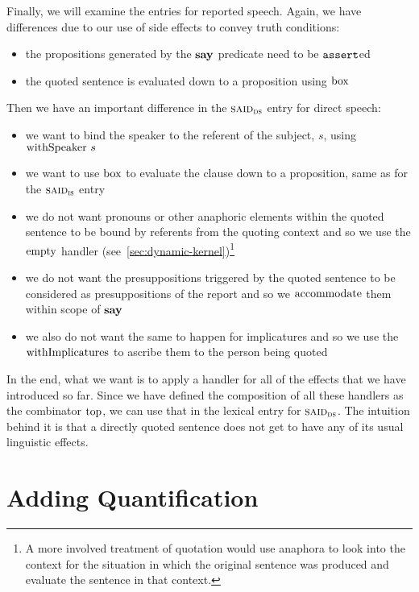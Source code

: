 Finally, we will examine the entries for reported speech. Again, we have
differences due to our use of side effects to convey truth conditions:

\begin{itemize}
\item the propositions generated by the $\textbf{say}$ predicate need to be
  $\mathtt{assert}$ed
\item the quoted sentence is evaluated down to a proposition using $\mathrm{box}$
\end{itemize}

Then we have an important difference in the $\textsc{said}_{\textsc{ds}}$ entry
for direct speech:

\begin{itemize}
\item we want to bind the speaker to the referent of the subject, $s$,
  using $\operatorname{withSpeaker}\,s$
\item we want to use $\mathrm{box}$ to evaluate the clause down to a proposition,
  same as for the $\textsc{said}_{\textsc{is}}$ entry
\item we do not want pronouns or other anaphoric elements within the quoted
  sentence to be bound by referents from the quoting context and so we use
  the $\operatorname{empty}$ handler (see~\ref{sec:dynamic-kernel})\footnote{A more
    involved treatment of quotation would use anaphora to look into the
    context for the situation in which the original sentence was produced
    and evaluate the sentence in that context.}
\item we do not want the presuppositions triggered by the quoted sentence
  to be considered as presuppositions of the report and so we
  $\operatorname{accommodate}$ them within scope of $\textbf{say}$
\item we also do not want the same to happen for implicatures and so we use
  the $\operatorname{withImplicatures}$ to ascribe them to the person being quoted
\end{itemize}

In the end, what we want is to apply a handler for all of the effects that
we have introduced so far. Since we have defined the composition of all
these handlers as the combinator $\operatorname{top}$, we can use that in the lexical
entry for $\textsc{said}_{\textsc{ds}}$. The intuition behind it is that a
directly quoted sentence does not get to have any of its usual linguistic
effects.


\section{Adding Quantification}
\label{sec:adding-quantification}


